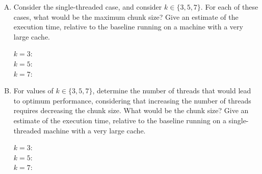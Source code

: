 \documentclass[11pt]{article}
\newenvironment{choice}{\begin{enumerate}[A.]}{\end{enumerate}}
\newenvironment{answer}{\begin{minipage}[c][2.0in]{\textwidth}}{\end{minipage}}
\begin{document}
\begin{choice}
\begin{answer}
\begin{description}
\item[Baseline:] 

\item[Chunked:]

\item[Ratio:]

\end{description} 
\end{answer}

\item
Consider the single-threaded case, and consider $k \in \{3,5,7\}$.
For each of these cases, what would be the maximum chunk size?
Give an estimate of the execution time, relative to
the baseline running on a machine with a very large
cache.

\begin{answer}
\begin{description}
\item[$k=3$:]

\item[$k=5$:]

\item[$k=7$:]

\end{description}
\end{answer}

\item
For values of $k \in \{3,5,7\}$, determine the number of threads that
would lead to optimum performance, considering that increasing the
number of threads requires decreasing the chunk size.  What would be
the chunk size?  Give an estimate of the execution time, relative to
the baseline running on a single-threaded machine with a very large
cache.

\begin{answer}
\begin{description}
\item[$k=3$:]

\item[$k=5$:]

\item[$k=7$:]

\end{description}
\end{answer}

\end{choice}
\end{document}
